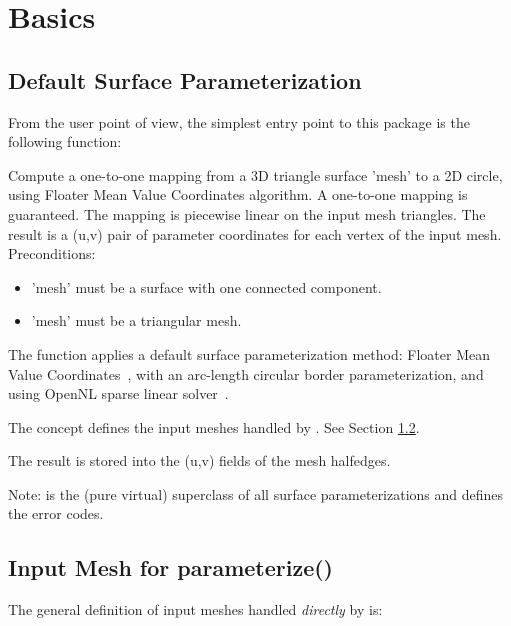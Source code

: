 \section{Basics}


\subsection{Default Surface Parameterization}

From the user point of view, the simplest entry point to this package
is the following function:

{
Compute a one-to-one mapping from a 3D triangle surface 'mesh' to a 2D circle, using Floater Mean Value Coordinates algorithm. A one-to-one mapping is guaranteed.
The mapping is piecewise linear on the input mesh triangles. The result is a (u,v) pair of parameter coordinates for each vertex of the input mesh.
Preconditions:\begin{itemize}
\item 'mesh' must be a surface with one connected component.\item 'mesh' must be a triangular mesh.\end{itemize}
}

The  function applies a default surface parameterization
method: Floater Mean Value Coordinates~\cite{cgal:f-mvc-03}, with an
arc-length circular border parameterization, and using OpenNL sparse
linear solver~\cite{cgal:l-nmdgp-05}.

The  concept defines the input meshes handled
by . See Section \ref{sec:Input-Mesh-for-parameterize}.

The result is stored into the (u,v) fields of the mesh halfedges.

Note:  is the (pure virtual)
superclass of all surface parameterizations and defines the error codes.


\subsection{Input Mesh for parameterize()}
\label{sec:Input-Mesh-for-parameterize}

The general definition of input meshes handled \emph{directly} by  is:

